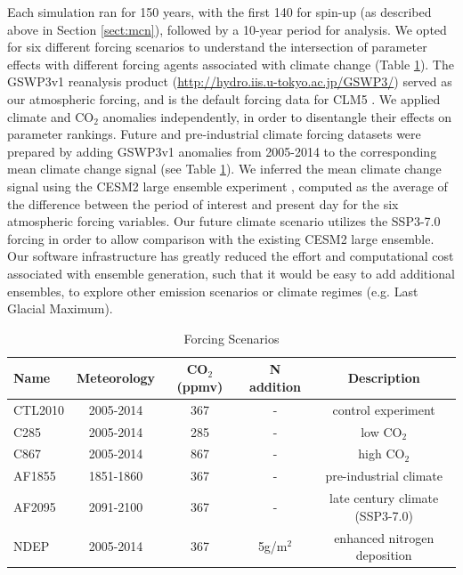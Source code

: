 \documentclass[draft]{agujournal2019}
\begin{document}
Each simulation ran for 150 years, with the first 140 for spin-up (as described above in Section \ref{sect:mcn}), followed by a 10-year period for analysis. We opted for six different forcing scenarios to understand the intersection of parameter effects with different forcing agents associated with climate change (Table \ref{tab:exps}). The GSWP3v1 reanalysis product (\url{http://hydro.iis.u-tokyo.ac.jp/GSWP3/}) served as our atmospheric forcing, and is the default forcing data for CLM5 \cite{lawrence2019}. We applied climate and CO$_2$ anomalies independently, in order to disentangle their effects on parameter rankings. Future and pre-industrial climate forcing datasets were prepared by adding GSWP3v1 anomalies from 2005-2014 to the corresponding mean climate change signal (see Table \ref{tab:exps}). We inferred the mean climate change signal using the CESM2 large ensemble experiment \cite{rodgers2021}, computed as the average of the difference between the period of interest and present day for the six atmospheric forcing variables. Our future climate scenario utilizes the SSP3-7.0 forcing in order to allow comparison with the existing CESM2 large ensemble. Our software infrastructure has greatly reduced the effort and computational cost associated with ensemble generation, such that it would be easy to add additional ensembles, to explore other emission scenarios or climate regimes (e.g. Last Glacial Maximum).  

\label{sect:exps}
 \begin{table}[h]
 \caption{Forcing Scenarios}
 \centering
 \begin{tabular}{l c c c c}
 \hline
  Name  & Meteorology & CO$_2$ (ppmv) & N addition & Description \\
 \hline
   CTL2010  & 2005-2014 & 367 & - & control experiment\\
   C285        & 2005-2014 & 285 & - & low CO$_2$ \\
   C867        & 2005-2014 & 867 & - & high CO$_2$ \\
   AF1855    & 1851-1860 & 367 & - & pre-industrial climate \\
   AF2095    & 2091-2100 & 367 & - & late century climate (SSP3-7.0) \\
   NDEP      & 2005-2014 & 367 & 5g/m$^2$ & enhanced nitrogen deposition \\
 \hline
 \end{tabular}
 \label{tab:exps}
 \end{table}
\end{document}
